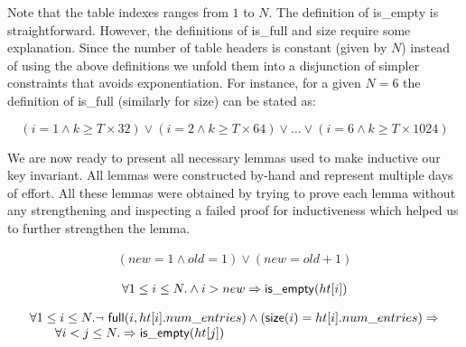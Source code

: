 \noindent Note that the table indexes ranges from $1$ to $N$. The
definition of \textsf{is\_empty} is straightforward. However, the
definitions of \textsf{is\_full} and \textsf{size} require some
explanation. Since the number of table headers is constant (given by
$N$) instead of using the above definitions we unfold them into a
disjunction of simpler constraints that avoids exponentiation. For
instance, for a given $N=6$ the definition of \textsf{is\_full}
(similarly for \textsf{size}) can be stated as:

\[ (i=1 \wedge k \geq T \times 32) \vee (i=2 \wedge k \geq T \times 64) \vee \ldots \vee (i=6 \wedge k \geq T \times 1024) \]

We are now ready to present all necessary lemmas used to make
inductive our key invariant. All lemmas were constructed by-hand and
represent multiple days of effort. All these lemmas were obtained by
trying to prove each lemma without any strengthening and inspecting a
failed proof for inductiveness which helped us to further strengthen
the lemma.

\begin{lemma}
  \begin{equation*}
    \begin{array}{l}      
      (new = 1 \wedge old = 1) \vee (new = old+1)
    \end{array}
  \end{equation*}
  \label{old_and_new}
\end{lemma}

\begin{lemma}
  \begin{equation*}
\begin{array}{l}      
  \forall 1 \leq i \leq N.  \wedge i > new \Rightarrow \mathsf{is\_empty}(\mbox{$ht[i]$})
\end{array}
\end{equation*}  
\label{empty_beyond_new}  
\end{lemma}  

\begin{lemma}
  \begin{equation*}
\begin{array}{l}        
  \forall 1 \leq i \leq N.  \mbox{$\neg\ \mathsf{full}(i,
    \mbox{$ht[i]$}.num\_entries)$} \wedge (\mathsf{size}(i) =
  \mbox{$ht[i]$}.num\_entries) \Rightarrow \\
  \quad \quad  \forall i < j \leq N.  \Rightarrow \mathsf{is\_empty}(\mbox{$ht[j]$})
\end{array}
\end{equation*} 
\label{empty_beyond_non_full}
\end{lemma}

